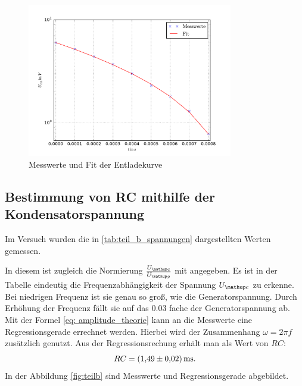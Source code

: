 \begin{figure}
  \centering
  \includegraphics [width=0.8\textwidth]{pics/teil_a_entladung.pdf}
  \caption{Messwerte und Fit der Entladekurve}
  \label{fig:plot_teila}
\end{figure}


\subsection{Bestimmung von RC mithilfe der Kondensatorspannung}
Im Versuch wurden die in \ref{tab:teil_b_spannungen} dargestellten Werten gemessen.



In diesem ist zugleich die Normierung $\frac{U\ua{c}}{U\ua{g}}$
mit angegeben.
Es ist in der Tabelle eindeutig die Frequenzabhängigkeit der Spannung $U\ua{c}$ zu erkenne.
Bei niedrigen Frequenz ist sie genau so groß, wie die Generatorspannung.
Durch Erhöhung der Frequenz fällt sie auf das $0.03$ fache der Generatorspannung ab.
Mit der Formel \eqref{eq: amplitude_theorie} kann an die Messwerte eine Regressionsgerade
errechnet werden. Hierbei wird der Zusammenhang $\omega=2\pi f$ zusätzlich genutzt.
Aus der Regressionsrechung erhält man als Wert von $RC$:
\begin{equation}
  \label{eq:rc_teilb}
  RC=\SI{1.49\pm0.02}{\milli\second}.
\end{equation}
In der Abbildung \ref{fig:teilb} sind Messwerte und Regressionsgerade abgebildet.

